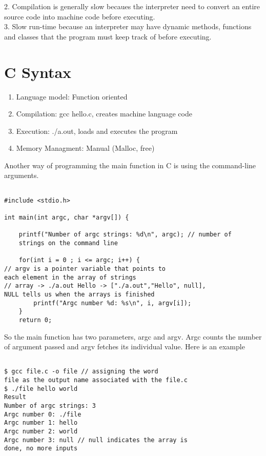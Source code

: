 \documentclass{article}
\begin{document}
2. Compilation is generally slow becaues the interpreter need to convert an entire source code into machine code before executing. \\

3. Slow run-time because an interpreter may have dynamic methods, functions and classes that the program must keep track of before executing. \\

\section{C Syntax} 
\begin{enumerate}
\item Language model: Function oriented 
\item Compilation: gcc hello.c, creates machine language code
\item Execution: ./a.out, loads and executes the program
\item Memory Managment: Manual (Malloc, free)
\end{enumerate}

Another way of programming the main function in C is using the command-line arguments. \\

\begin{verbatim}

#include <stdio.h>

int main(int argc, char *argv[]) {

	printf("Number of argc strings: %d\n", argc); // number of 
	strings on the command line

	for(int i = 0 ; i <= argc; i++) {
// argv is a pointer variable that points to 
each element in the array of strings
// array -> ./a.out Hello -> ["./a.out","Hello", null], 
NULL tells us when the arrays is finished
		printf("Argc number %d: %s\n", i, argv[i]);
	}
	return 0;

\end{verbatim}


\noindent So the main function has two parameters, argc and argv. Argc counts the number of argument passed and argv 
fetches its individual value. Here is an example

\begin{verbatim}

$ gcc file.c -o file // assigning the word 
file as the output name associated with the file.c
$ ./file hello world
Result 
Number of argc strings: 3
Argc number 0: ./file
Argc number 1: hello
Argc number 2: world
Argc number 3: null // null indicates the array is 
done, no more inputs
\end{verbatim}
\end{document}
